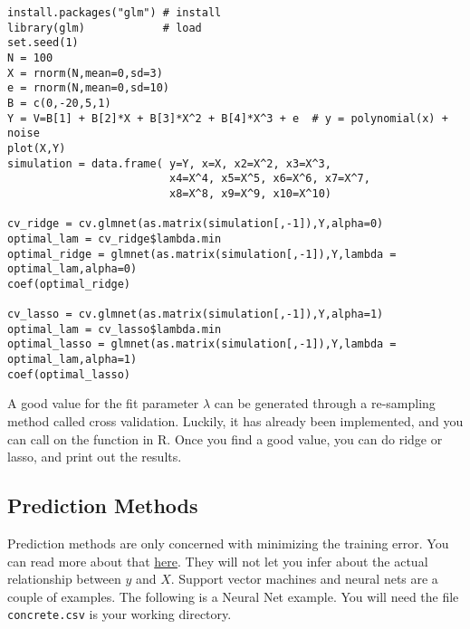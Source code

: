 \documentclass{article}
\begin{document}
\begin{verbatim}
install.packages("glm") # install
library(glm)            # load
set.seed(1)
N = 100
X = rnorm(N,mean=0,sd=3)
e = rnorm(N,mean=0,sd=10)
B = c(0,-20,5,1)
Y = V=B[1] + B[2]*X + B[3]*X^2 + B[4]*X^3 + e  # y = polynomial(x) + noise
plot(X,Y)
simulation = data.frame( y=Y, x=X, x2=X^2, x3=X^3,
                         x4=X^4, x5=X^5, x6=X^6, x7=X^7,
                         x8=X^8, x9=X^9, x10=X^10)

cv_ridge = cv.glmnet(as.matrix(simulation[,-1]),Y,alpha=0)
optimal_lam = cv_ridge$lambda.min
optimal_ridge = glmnet(as.matrix(simulation[,-1]),Y,lambda = optimal_lam,alpha=0)
coef(optimal_ridge)

cv_lasso = cv.glmnet(as.matrix(simulation[,-1]),Y,alpha=1)
optimal_lam = cv_lasso$lambda.min
optimal_lasso = glmnet(as.matrix(simulation[,-1]),Y,lambda = optimal_lam,alpha=1)
coef(optimal_lasso)
\end{verbatim}
A good value for the fit parameter $\lambda$ can be generated through a re-sampling method called cross validation. Luckily, it has already been implemented, and you can call on the function in R. Once you find a good value, you can do ridge or lasso, and print out the results.

\subsection{Prediction Methods}
Prediction methods are only concerned with minimizing the training error. You can read more about that \href{https://en.wikipedia.org/wiki/Training,_validation,_and_test_sets}{here}. They will not let you infer about the actual relationship between $y$ and $X$. Support vector machines and neural nets are a couple of examples. The following is a Neural Net example. You will need the file \texttt{concrete.csv} is your working directory.
\end{document}
